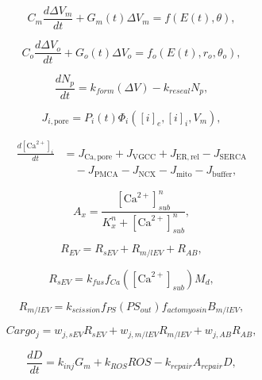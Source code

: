 \documentclass[Afour,sagev,times]{sagej}
\begin{document}
\begin{equation}
C_m\frac{d\Delta V_m}{dt}+G_m(t)\Delta V_m=f(E(t),\theta),
\end{equation}

\begin{equation}
C_o\frac{d\Delta V_o}{dt}+G_o(t)\Delta V_o=f_o(E(t),r_o,\theta_o),
\end{equation}

\begin{equation}
\frac{dN_p}{dt}=k_{form}(\Delta V)-k_{reseal}N_p,
\end{equation}

\begin{equation}
J_{i,\mathrm{pore}}=P_i(t)\Phi_i([i]_e,[i]_i,V_m),
\end{equation}

\begin{equation}
\begin{aligned}
\frac{d[\mathrm{Ca}^{2+}]_i}{dt} &=
J_{\mathrm{Ca,pore}}+J_{\mathrm{VGCC}}+J_{\mathrm{ER,rel}}
-J_{\mathrm{SERCA}} \\
&\quad -J_{\mathrm{PMCA}}-J_{\mathrm{NCX}}-J_{\mathrm{mito}}-J_{\mathrm{buffer}},
\end{aligned}
\end{equation}

\begin{equation}
A_x=\frac{[\mathrm{Ca}^{2+}]_{sub}^n}{K_x^n+[\mathrm{Ca}^{2+}]_{sub}^n},
\end{equation}

\begin{equation}
R_{EV}=R_{sEV}+R_{m/lEV}+R_{AB},
\end{equation}

\begin{equation}
R_{sEV}=k_{fus}f_{Ca}([\mathrm{Ca}^{2+}]_{sub})M_d,
\end{equation}

\begin{equation}
R_{m/lEV}=k_{scission}f_{PS}(PS_{out})f_{actomyosin}B_{m/lEV},
\end{equation}

\begin{equation}
Cargo_j=w_{j,sEV}R_{sEV}+w_{j,m/lEV}R_{m/lEV}+w_{j,AB}R_{AB},
\end{equation}

\begin{equation}
\frac{dD}{dt}=k_{inj}G_m+k_{ROS}ROS-k_{repair}A_{repair}D,
\end{equation}
\end{document}
